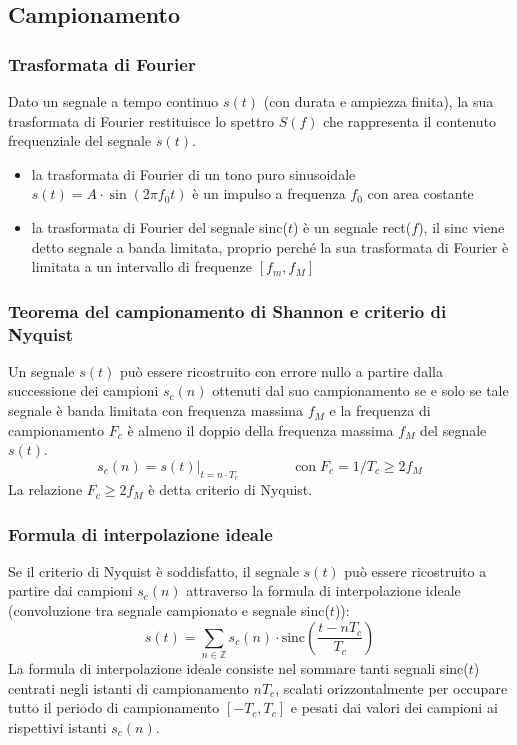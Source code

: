 \newpage

\subsection{Campionamento}
\subsubsection*{Trasformata di Fourier}
Dato un segnale a tempo continuo \(s(t)\) (con durata e ampiezza finita), la sua trasformata di Fourier restituisce lo
spettro \(S(f)\) che rappresenta il contenuto frequenziale del segnale \(s(t)\).
\begin{itemize}
	\item la trasformata di Fourier di un tono puro sinusoidale \(s(t) = A \cdot \sin(2\pi f_0 t)\) è un impulso a frequenza
	\(f_0\) con area costante
	\item la trasformata di Fourier del segnale sinc(\(t\)) è un segnale rect(\(f\)), il sinc viene detto segnale a banda
	limitata, proprio perché la sua trasformata di Fourier è limitata a un intervallo di frequenze \([f_m, f_M]\)
\end{itemize}

\subsubsection*{Teorema del campionamento di Shannon e criterio di Nyquist}
Un segnale \(s(t)\) può essere ricostruito con errore nullo a partire dalla successione dei campioni \(s_c(n)\)
ottenuti dal suo campionamento se e solo se tale segnale è banda limitata con frequenza massima \(f_M\) e la
frequenza di campionamento \(F_c\) è almeno il doppio della frequenza massima \(f_M\) del segnale \(s(t)\).
\[s_c(n) = s(t) \big|_{t=n \cdot T_c} \qquad\qquad \text{con} \; F_c = 1 / T_c \geq 2 f_M\]
La relazione \(F_c \geq 2 f_M\) è detta criterio di Nyquist.

\subsubsection*{Formula di interpolazione ideale}
Se il criterio di Nyquist è soddisfatto, il segnale \(s(t)\) può essere ricostruito a partire dai campioni \(s_c(n)\)
attraverso la formula di interpolazione ideale (convoluzione tra segnale campionato e segnale sinc(\(t\))):
\[s(t) = \sum_{n \in \mathbb{Z}} s_c(n) \cdot \text{sinc}\!\left(\frac{t - n T_c}{T_c}\right)\]
La formula di interpolazione ideale consiste nel sommare tanti segnali sinc(\(t\)) centrati negli istanti di campionamento
\(n T_c\), scalati orizzontalmente per occupare tutto il periodo di campionamento \([-T_c, T_c]\) e pesati dai valori dei
campioni ai rispettivi istanti \(s_c(n)\).

